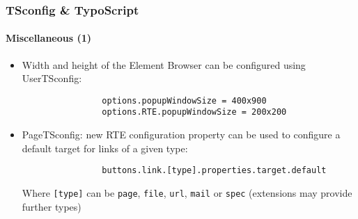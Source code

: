 \begin{frame}[fragile]
	\frametitle{TSconfig \& TypoScript}
	\framesubtitle{Miscellaneous (1)}

	\begin{itemize}
		\item Width and height of the Element Browser can be configured using UserTSconfig:

			\begin{lstlisting}
				options.popupWindowSize = 400x900
				options.RTE.popupWindowSize = 200x200
			\end{lstlisting}


		\item PageTSconfig: new RTE configuration property can be used to configure a default target for links of a given type:

			\begin{lstlisting}
				buttons.link.[type].properties.target.default
			\end{lstlisting}

			Where \texttt{[type]} can be \texttt{page}, \texttt{file}, \texttt{url}, \texttt{mail} or \texttt{spec}\newline
			(extensions may provide further types)

	\end{itemize}

\end{frame}


